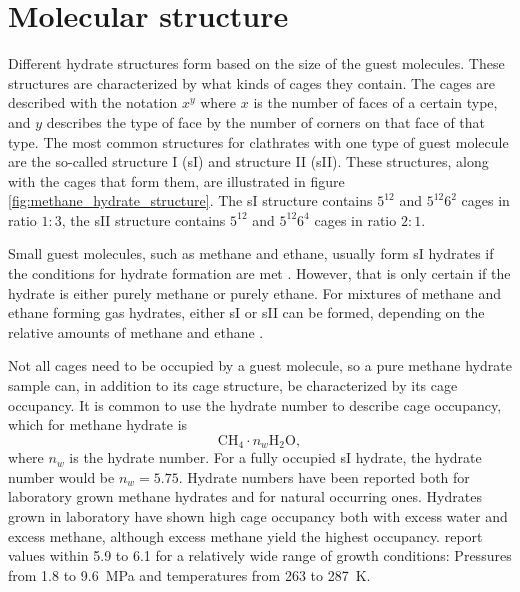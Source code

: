 \section{Molecular structure}
Different hydrate structures form based on the size of the guest molecules. These structures are characterized by what kinds of cages they contain. The cages are described with the notation $x^y$ where $x$ is the number of faces of a certain type, and $y$ describes the type of face by the number of corners on that face of that type. The most common structures for clathrates with one type of guest molecule are the so-called structure I (sI) and structure II (sII). These structures, along with the cages that form them, are illustrated in figure \ref{fig:methane_hydrate_structure}. The sI structure contains $5^{12}$ and $5^{12}6^2$ cages in ratio $1:3$, the sII structure contains $5^{12}$ and $5^{12}6^4$ cages in ratio $2:1$.  

Small guest molecules, such as methane and ethane, usually form sI hydrates if the conditions for hydrate formation are met \cite{Hester2009}. However, that is only certain if the hydrate is either purely methane or purely ethane. For mixtures of methane and ethane forming gas hydrates, either sI or sII can be formed, depending on the relative amounts of methane and ethane \cite{Subramanian20001981}. 

Not all cages need to be occupied by a guest molecule, so a pure methane hydrate sample can, in addition to its cage structure, be characterized by its cage occupancy. It is common to use the hydrate number to describe cage occupancy, which for methane hydrate is
%
\begin{equation}
	\mathrm{CH_4} \cdot n_w \mathrm{H_2O},
\end{equation}
%
where $n_w$ is the hydrate number. For a fully occupied sI hydrate, the hydrate number would be $n_w = 5.75$. Hydrate numbers have been reported both for laboratory grown methane hydrates and for natural occurring ones. Hydrates grown in laboratory have shown high cage occupancy both with excess water and excess methane, although excess methane yield the highest occupancy. \citet{Circone2005} report values within 5.9 to 6.1 for a relatively wide range of growth conditions: Pressures from 1.8 to \SI{9.6}{\mega\pascal} and temperatures from 263 to \SI{287}{\kelvin}. 

